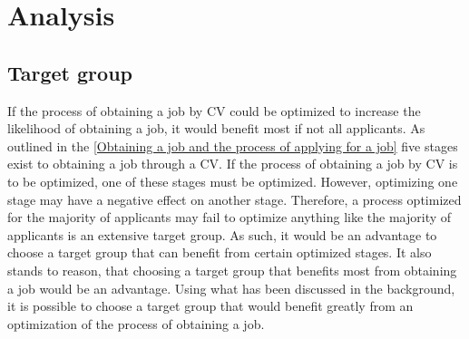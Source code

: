 \section{Analysis}\label{sec:analysis}

\subsection{Target group}
If the process of obtaining a job by CV could be optimized to increase the likelihood of obtaining a job, it would benefit most if not all applicants.
As outlined in the \ref{Obtaining a job and the process of applying for a job} five stages exist to obtaining a job through a CV.
If the process of obtaining a job by CV is to be optimized, one of these stages must be optimized. 
However, optimizing one stage may have a negative effect on another stage.
Therefore, a process optimized for the majority of applicants may fail to optimize anything like the majority of applicants is an extensive target group.
As such, it would be an advantage to choose a target group that can benefit from certain optimized stages.
It also stands to reason, that choosing a target group that benefits most from obtaining a job would be an advantage.
Using what has been discussed in the background, it is possible to choose a target group that would benefit greatly from an optimization of the process of obtaining a job. \\

